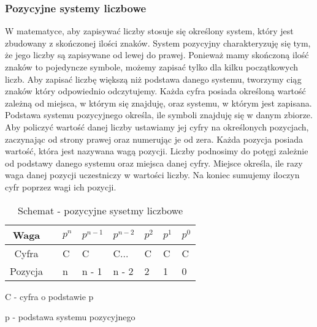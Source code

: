 \documentclass[12pt, a4paper, onside, polish]{article}				%
\begin{document}
\subsubsection{Pozycyjne systemy liczbowe}
\hspace{\parindent}
W matematyce, aby zapisywać liczby stosuje się określony system, który jest zbudowany z skończonej ilości znaków. System pozycyjny charakteryzuję się tym, że jego liczby są zapisywane od lewej do prawej. Ponieważ mamy skończoną ilość znaków to pojedyncze symbole, możemy zapisać tylko dla kilku początkowych liczb. Aby zapisać liczbę większą niż podstawa danego systemu, tworzymy ciąg znaków który odpowiednio odczytujemy. Każda cyfra posiada określoną wartość zależną od miejsca, w którym się znajduję, oraz systemu, w którym jest zapisana. Podstawa systemu pozycyjnego określa, ile symboli znajduję się w danym zbiorze. Aby policzyć wartość danej liczby ustawiamy jej cyfry na określonych pozycjach, zaczynając od strony prawej oraz numerując je od zera. Każda pozycja posiada wartość, która jest nazywana wagą pozycji. Liczby podnosimy do potęgi zależnie od podstawy danego systemu oraz miejsca danej cyfry. Miejsce określa, ile razy waga danej pozycji uczestniczy w wartości liczby. Na koniec sumujemy iloczyn cyfr poprzez wagi ich pozycji.  
\cleardoublepage



\begin{table}[htb]
\caption{Schemat - pozycyjne sysetmy liczbowe}
\centering
\begin{tabular}{|cl|l|l|l|l|l|l|}
\hline
Waga    &  & $p^{n}$ & $p^{n - 1}$ & $p^{n - 2}$ & $p^{2}$ & $p^{1}$ & $p^{0}$ \\ \hline
Cyfra   &  & C                    & C                      & C...                   & C                    & C                    & C                    \\ \hline
Pozycja &  & n                    & n - 1                    & n - 2                    & 2                    & 1                    & 0                    \\ \hline
\end{tabular}
\end{table}

C - cyfra o podstawie p

p - podstawa systemu pozycyjnego
\end{document}
